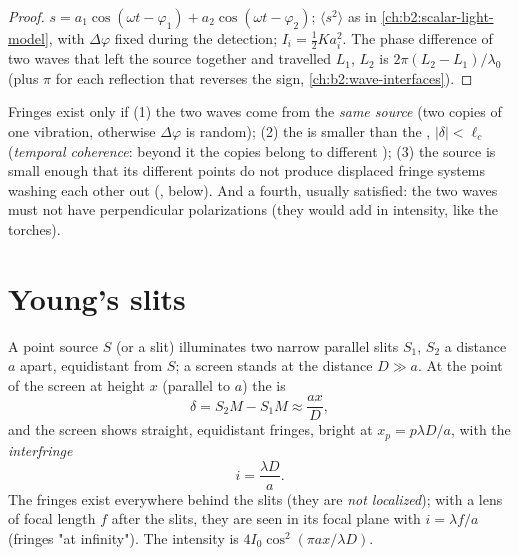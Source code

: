 \begin{proof}
$s = a_1\cos(\omega t - \varphi_1) + a_2\cos(\omega t - \varphi_2)$; $\langle s^2\rangle$ as in
\cref{ch:b2:scalar-light-model}, with $\Delta\varphi$ fixed during the
detection; $I_i = \tfrac12Ka_i^2$. The phase difference of two waves
that left the source together and travelled  $L_1$, $L_2$ is
$2\pi(L_2 - L_1)/\lambda_0$ (plus $\pi$ for each reflection that reverses the
sign, \cref{ch:b2:wave-interfaces}).
\end{proof}

\begin{remark}\label{rem:b2:two-wave-interference:conditions}
Fringes exist only if (1) the two waves come from the \emph{same
source} (two copies of one vibration, otherwise $\Delta\varphi$ is random); (2)
the  is smaller than the , $|\delta| < \ell_c$
(\emph{temporal coherence}: beyond it the copies belong to different
); (3) the source is small enough that its different points
do not produce displaced fringe systems washing each other out
(\emph{}, below). And a fourth, usually satisfied: the
two waves must not have perpendicular polarizations (they would add
in intensity, like the torches).
\end{remark}

\section{Young's slits}

\begin{proposition}\label{prop:b2:two-wave-interference:young}
A point source $S$ (or a slit) illuminates two narrow parallel slits
$S_1$, $S_2$ a distance $a$ apart, equidistant from $S$; a screen stands at
the distance $D \gg a$. At the point of the screen at height $x$ (parallel
to $a$) the  is
\[
\delta = S_2M - S_1M \approx \frac{ax}D ,
\]
and the screen shows straight, equidistant fringes, bright at $x_p =
p\lambda D/a$, with the \emph{interfringe}
\[
i = \frac{\lambda D}a .
\]
The fringes exist everywhere behind the slits (they are \emph{not
localized}); with a lens of focal length $f$ after the slits, they are
seen in its focal plane with $i = \lambda f/a$ (fringes "at infinity").
The intensity is $4I_0\cos^2(\pi ax/\lambda D)$.
\end{proposition}

